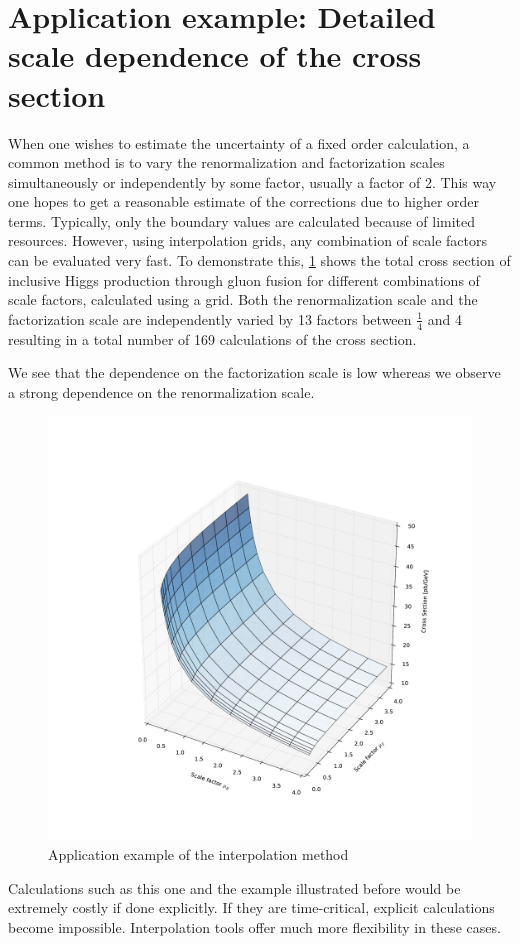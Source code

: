 \section{Application example: Detailed scale dependence of the cross section}
When one wishes to estimate the uncertainty of a fixed order calculation, a common method is to vary the renormalization and factorization scales simultaneously or independently by some factor, usually a factor of 2.
This way one hopes to get a reasonable estimate of the corrections due to higher order terms.
Typically, only the boundary values are calculated because of limited resources.
However, using interpolation grids, any combination of scale factors can be evaluated very fast.
To demonstrate this, \cref{fig:3dscale} shows the total cross section of inclusive Higgs production through gluon fusion for different combinations of scale factors, calculated using a \fnlo{} grid.
Both the renormalization scale and the factorization scale are independently varied by 13 factors between $\frac{1}{4}$ and \num{4} resulting in a total number of 169 calculations of the cross section.

We see that the dependence on the factorization scale is low whereas we observe a strong dependence on the renormalization scale.
%
\begin{figure}
	\centering
	\includegraphics[width=\textwidth]{images/3dscale.pdf}
	\caption{Application example of the interpolation method}
	\label{fig:3dscale}
\end{figure}
%

Calculations such as this one and the example illustrated before would be extremely costly if done explicitly.
If they are time-critical, explicit calculations become impossible.
Interpolation tools offer much more flexibility in these cases.
